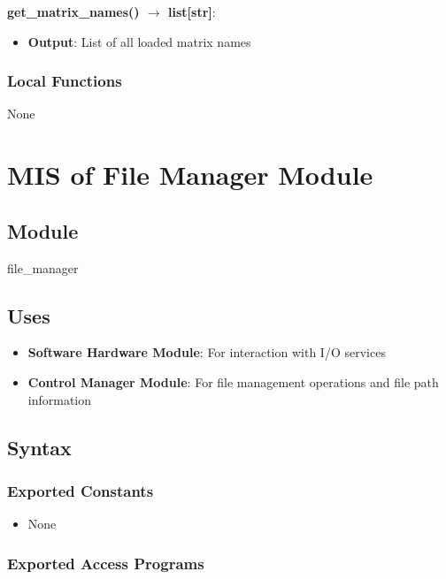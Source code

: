 \documentclass[12pt, titlepage]{article}
\begin{document}
\noindent \textbf{get\_matrix\_names() $\rightarrow$ list[str]}:
\begin{itemize}
    \item \textbf{Output}: List of all loaded matrix names
\end{itemize}

\subsubsection{Local Functions}

None

\newpage

\section{MIS of File Manager Module} \label{mSFM}

\subsection{Module}

file\_manager

\subsection{Uses}

\begin{itemize}
    \item \textbf{Software Hardware Module}: For interaction with I/O services
    \item \textbf{Control Manager Module}: For file management operations and file path information
\end{itemize}

\subsection{Syntax}

\subsubsection{Exported Constants}

\begin{itemize}
    \item None
\end{itemize}

\subsubsection{Exported Access Programs}
\end{document}
